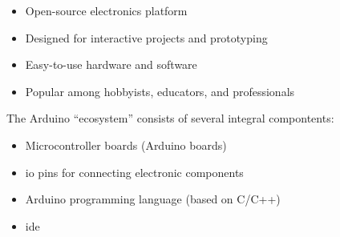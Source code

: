 \begin{frame}
    \begin{itemize}
        \item Open-source electronics platform
        \item Designed for interactive projects and prototyping
        \item Easy-to-use hardware and software
        \item Popular among hobbyists, educators, and professionals
    \end{itemize}
    \par The Arduino\textregistered{} ``ecosystem'' consists of several integral compontents:
    \begin{itemize}
        \item Microcontroller boards (Arduino\textregistered{} boards)
        \item \ac{io} pins for connecting electronic components
        \item Arduino\textregistered{} programming language (based on C/C++)
        \item \ac{ide}
    \end{itemize}
\end{frame}


